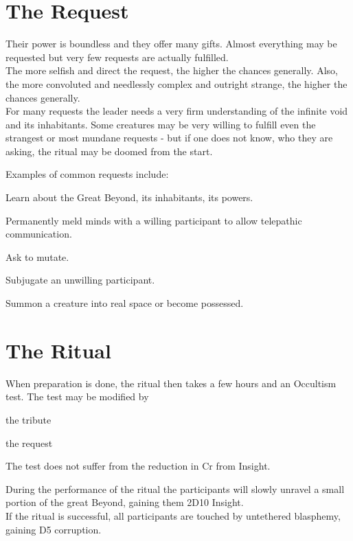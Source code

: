 \documentclass[11pt,a4paper,openany]{book}
\begin{document}
	\section{The Request}
	Their power is boundless and they offer many gifts. Almost everything may be requested but very few requests are actually fulfilled.
	\\
	The more selfish and direct the request, the higher the chances generally.
	Also, the more convoluted and needlessly complex and outright strange, the higher the chances generally.
	\\
	For many requests the leader needs a very firm understanding of the infinite void and its inhabitants. 
	Some creatures may be very willing to fulfill even the strangest or most mundane requests
		- but if one does not know, who they are asking,
		the ritual may be doomed from the start.
	\par
	Examples of common requests include:
	\begin{sitemize}
		\item Learn about the Great Beyond, its inhabitants, its powers.
		\item Permanently meld minds with a willing participant to allow telepathic communication.
		\item Ask to mutate.
		\item Subjugate an unwilling participant.
		\item Summon a creature into real space or become possessed.
	\end{sitemize}
	\section{The Ritual}
	When preparation is done, the ritual then takes a few hours and an Occultism test.
	The test may be modified by
	\begin{sitemize}
		\item the tribute
		\item the request
	\end{sitemize}
	\vspace{-8mm}
	The test does not suffer from the reduction in Cr from Insight.
	\par
	During the performance of the ritual the participants will slowly unravel a small portion of the great Beyond, gaining them 2D10 Insight.\\
	If the ritual is successful, all participants are touched by untethered blasphemy, gaining D5 corruption.
\end{document}
